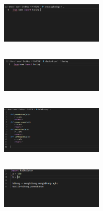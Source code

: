 \documentclass{article}
\begin{document}
\subsection{}
\begin{figure}[h]
\centerline{\includegraphics[width=5cm]{figure/D.PNG}}
\end{figure}
\newpage\subsection{}
\begin{figure}[h]
\centerline{\includegraphics[width=5cm]{figure/E.PNG}}
\end{figure}
\subsection{}
\begin{figure}[h]
\centerline{\includegraphics[width=5cm]{figure/F.PNG}}
\end{figure}
\newpage\subsection{}
\begin{figure}[h]
\centerline{\includegraphics[width=5cm]{figure/G.PNG}}
\end{figure}
\end{document}
